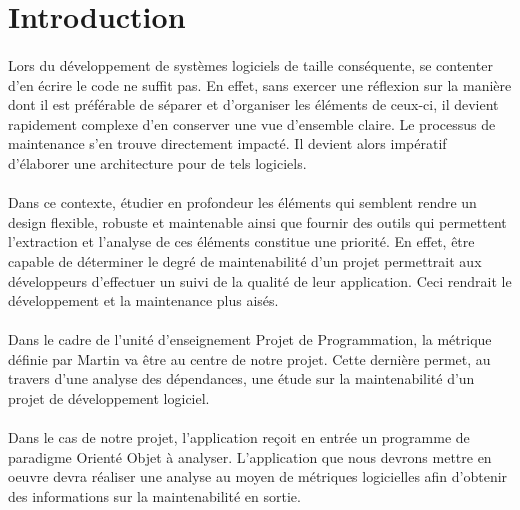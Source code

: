 \documentclass{scrartcl}
\begin{document}

\section{Introduction}
    
    \paragraph{}Lors du développement de systèmes logiciels de taille conséquente, se contenter d'en écrire le code ne suffit pas. En effet, sans exercer une réflexion sur la manière dont il est préférable de séparer et d'organiser les éléments de ceux-ci, il devient rapidement complexe d'en conserver une vue d'ensemble claire. Le processus de maintenance s'en trouve directement impacté. Il devient alors impératif d'élaborer une architecture pour de tels logiciels.


    \paragraph{}Dans ce contexte, étudier en profondeur les éléments qui semblent rendre un design flexible, robuste et maintenable ainsi que fournir des outils qui permettent l'extraction et l'analyse de ces éléments constitue une priorité. En effet, être capable de déterminer le degré de maintenabilité d'un projet permettrait aux développeurs d'effectuer un suivi de la qualité de leur application. Ceci rendrait le développement et la maintenance plus aisés.

    \paragraph{}Dans le cadre de l'unité d'enseignement \og Projet de Programmation\fg, la métrique définie par Martin\cite{Martin:1994} va être au centre de notre projet. Cette dernière permet, au travers d'une analyse des dépendances, une étude sur la maintenabilité d'un projet de développement logiciel.

    \paragraph{}Dans le cas de notre projet, l'application reçoit en entrée un programme de paradigme Orienté Objet à analyser. L'application que nous devrons mettre en oeuvre devra réaliser une analyse au moyen de métriques logicielles afin d'obtenir des informations sur la maintenabilité en sortie.
\end{document}
